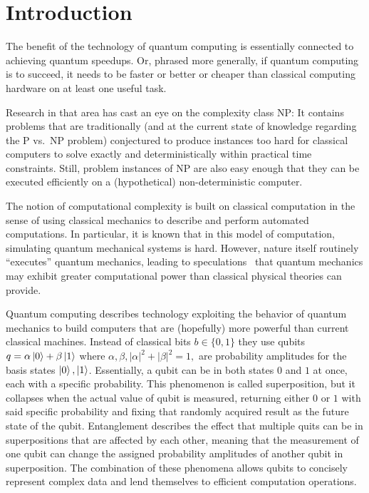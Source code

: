 \section{Introduction}

The benefit of the technology of quantum computing is essentially connected to achieving quantum speedups. Or, phrased more generally, if quantum computing is to succeed, it needs to be faster or better or cheaper than classical computing hardware on at least one useful task.

Research in that area has cast an eye on the complexity class NP: It contains problems that are traditionally (and at the current state of knowledge regarding the P vs.\ NP problem) conjectured to produce instances too hard for classical computers to solve exactly and deterministically within practical time constraints. Still, problem instances of NP are also easy enough that they can be executed efficiently on a (hypothetical) non-deterministic computer.

The notion of computational complexity is built on classical
computation in the sense of using classical mechanics to describe and
perform automated computations. In particular, it is known that in this
model of computation, simulating quantum mechanical systems is hard. However, nature itself routinely ``executes'' quantum mechanics, leading to
speculations~\cite{feynman1981simulating} that quantum mechanics may
 exhibit greater computational power than classical physical theories
can provide.

Quantum computing describes technology exploiting the behavior of quantum mechanics to build computers that are (hopefully) more powerful than current classical machines. Instead of classical bits $b \in \{0, 1\}$ they use qubits $q = \alpha\ket{0} + \beta\ket{1}$ where $\alpha, \beta, |\alpha|^2 + |\beta|^2 = 1,$ are probability amplitudes for the basis states $\ket{0}, \ket{1}$. Essentially, a qubit can be in both states $0$ and $1$ at once, each with a specific probability. This phenomenon is called superposition, but it collapses when the actual value of qubit is measured, returning either $0$ or $1$ with said specific probability and fixing that randomly acquired result as the future state of the qubit. Entanglement describes the effect that multiple quits can be in superpositions that are affected by each other, meaning that the measurement of one qubit can change the assigned probability amplitudes of another qubit in superposition. The combination of these phenomena allows qubits to concisely represent complex data and lend themselves to efficient computation operations.


